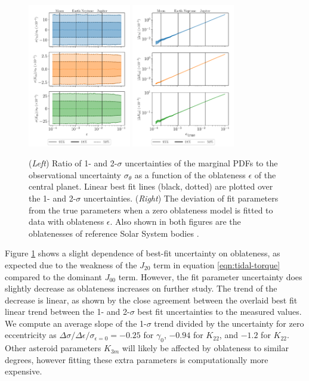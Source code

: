 \documentclass{aastex631}
\begin{document}
\begin{figure}
  \centering
  \includegraphics[width=0.4\textwidth]{oblateness.pdf}
  \includegraphics[width=0.4\textwidth]{oblateness-differ.pdf}
  \caption{(\textit{Left}) Ratio of 1- and 2-$\sigma$ uncertainties of the marginal PDFs to the observational uncertainty $\sigma_\theta$ as a function of the oblateness $\epsilon$ of the central planet. Linear best fit lines (black, dotted) are plotted over the 1- and 2-$\sigma$ uncertainties. (\textit{Right}) The deviation of fit parameters from the true parameters when a zero oblateness model is fitted to data with oblateness $\epsilon$. Also shown in both figures are the oblatenesses of reference Solar System bodies \cite{pater_lissauer_2015}.}
  \label{fig:oblateness}
\end{figure}

Figure \ref{fig:oblateness} shows a slight dependence of best-fit uncertainty on oblateness, as expected due to the weakness of the $J_{20}$ term in equation \ref{eqn:tidal-torque} compared to the dominant $J_{00}$ term. However, the fit parameter uncertainty does slightly decrease as oblateness increases on further study. The trend of the decrease is linear, as shown by the close agreement between the overlaid best fit linear trend between the 1- and 2-$\sigma$ best fit uncertainties to the measured values. We compute an average slope of the 1-$\sigma$ trend divided by the uncertainty for zero eccentricity as $\Delta \sigma / \Delta \epsilon / \sigma_{\epsilon=0}= -0.25$ for $\gamma_0$, $-0.94$ for $K_{22}$, and $-1.2$ for $K_{22}$. Other asteroid parameters $K_{3m}$ will likely be affected by oblateness to similar degrees, however fitting these extra parameters is computationally more expensive.
\end{document}
